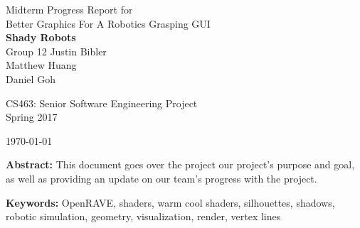 \documentclass[10pt,journal,compsoc,draftclsnofoot]{IEEEtran}
\begin{document}
\onecolumn

\begin{titlepage}
\null
\vspace{15mm}

\begin{flushleft}
\begin{bfseries}
	\vskip2mm
	\Huge{Midterm Progress Report for\\ Better Graphics For A Robotics Grasping GUI}\\
	\vspace{15mm}
	\textbf{\huge Shady Robots} \\
	\vskip2mm
	\large{Group 12}
	\vskip5mm
	\Large{Justin Bibler \\
	Matthew Huang \\
	Daniel Goh \\}
\end{bfseries}

\vspace{15mm}
\Large{CS463: Senior Software Engineering Project} \\
\Large{Spring 2017} \\

\vspace{5mm}

\today

\vfill

\begin{normalsize}
{\bf Abstract:}
This document goes over the project our project's purpose and goal, as well as providing an update on our team's progress with the project.

{\bf Keywords:} OpenRAVE, shaders, warm cool shaders, silhouettes, shadows, robotic simulation, geometry, visualization, render, vertex lines
\end{normalsize}
\end{flushleft}

\newpage

\end{titlepage}
\end{document}
